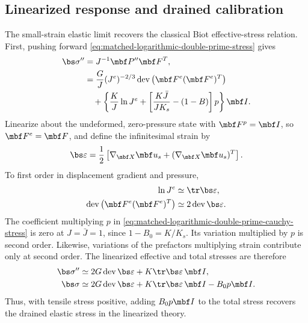 \subsection{Linearized response and drained calibration}

The small-strain elastic limit recovers the classical Biot effective-stress
relation.  First, pushing forward
\eqref{eq:matched-logarithmic-double-prime-stress} gives
\begin{align}
 \bs\sigma^{\prime\prime}
 &=J^{-1}\mbf P^{\prime\prime}\mbf F^T,
 \notag
\\
 &=\frac{G}{J}(J^e)^{-2/3}
 \operatorname{dev}\left(\mbf F^e(\mbf F^e)^T\right) \notag\\
 &\quad+\left\{\frac{K}{J}\ln J^e
 +\left[\frac{K\bar J}{JK_s}-(1-B)\right]p\right\}\mbf I.
 \label{eq:matched-logarithmic-double-prime-cauchy-stress}
\end{align}
Linearize about the undeformed, zero-pressure state with
\(\mbf F^p=\mbf I\), so \(\mbf F^e=\mbf F\), and define the infinitesimal
strain by
\begin{equation*}
 \bs\varepsilon=\frac12\left[
 \nabla_{\mbf X}\mbf u_s+(\nabla_{\mbf X}\mbf u_s)^T\right].
\end{equation*}
To first order in displacement gradient and pressure,
\begin{align*}
 \ln J^e&\simeq\tr\bs\varepsilon,
\\
 \operatorname{dev}\left(\mbf F^e(\mbf F^e)^T\right)
 &\simeq2\operatorname{dev}\bs\varepsilon.
\end{align*}
The coefficient multiplying \(p\) in
\eqref{eq:matched-logarithmic-double-prime-cauchy-stress} is zero at
\(J=\bar J=1\), since \(1-B_0=K/K_s\).  Its variation multiplied by
\(p\) is second order.  Likewise, variations of the prefactors multiplying
strain contribute only at second order.  The linearized effective and total
stresses are therefore
\begin{align*}
 \bs\sigma^{\prime\prime}
 &\simeq2G\operatorname{dev}\bs\varepsilon
 +K\tr\bs\varepsilon\,\mbf I,
\\
 \bs\sigma
 &\simeq2G\operatorname{dev}\bs\varepsilon
 +K\tr\bs\varepsilon\,\mbf I-B_0p\mbf I.
\end{align*}
Thus, with tensile stress positive, adding \(B_0p\mbf I\) to the total
stress recovers the drained elastic stress in the linearized theory.

